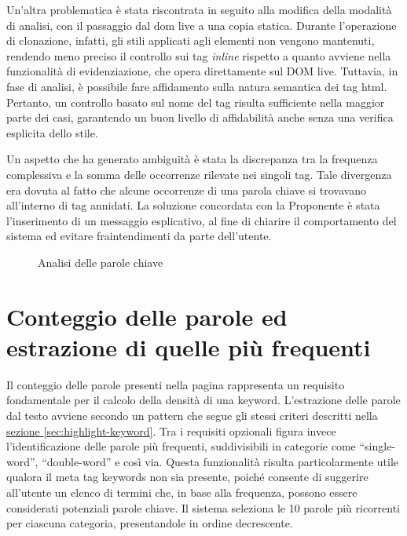 \vspace{10pt}
\par\noindent Un’altra problematica è stata riscontrata in seguito alla modifica della modalità di analisi, con il passaggio dal \gls{dom} live a una copia statica. Durante l’operazione di clonazione, infatti, gli stili applicati agli elementi non vengono mantenuti, rendendo meno preciso il controllo sui tag \textit{inline} rispetto a quanto avviene nella funzionalità di evidenziazione, che opera direttamente sul DOM live. Tuttavia, in fase di analisi, è possibile fare affidamento sulla natura semantica dei tag \gls{html}. Pertanto, un controllo basato sul nome del tag risulta sufficiente nella maggior parte dei casi, garantendo un buon livello di affidabilità anche senza una verifica esplicita dello stile.

\vspace{10pt}
\par\noindent Un aspetto che ha generato ambiguità è stata la discrepanza tra la frequenza complessiva e la somma delle occorrenze rilevate nei singoli tag. Tale divergenza era dovuta al fatto che alcune occorrenze di una parola chiave si trovavano all’interno di tag annidati. La soluzione concordata con la Proponente è stata l’inserimento di un messaggio esplicativo, al fine di chiarire il comportamento del sistema ed evitare fraintendimenti da parte dell’utente.

\begin{figure}[H]
  \centering 
  \caption{Analisi delle parole chiave}
\end{figure}

\section{Conteggio delle parole ed estrazione di quelle più frequenti}
\label{sec:count-word}

\par Il conteggio delle parole presenti nella pagina rappresenta un requisito fondamentale per il calcolo della densità di una keyword. L'estrazione delle parole dal testo avviene secondo un pattern che segue gli stessi criteri descritti nella \hyperref[sec:highlight-keyword]{sezione \textsection\ref*{sec:highlight-keyword}}. Tra i requisiti opzionali figura invece l'identificazione delle parole più frequenti, suddivisibili in categorie come “single-word”, “double-word” e così via. Questa funzionalità risulta particolarmente utile qualora il meta tag keywords non sia presente, poiché consente di suggerire all’utente un elenco di termini che, in base alla frequenza, possono essere considerati potenziali parole chiave. Il sistema seleziona le 10 parole più ricorrenti per ciascuna categoria, presentandole in ordine decrescente.

